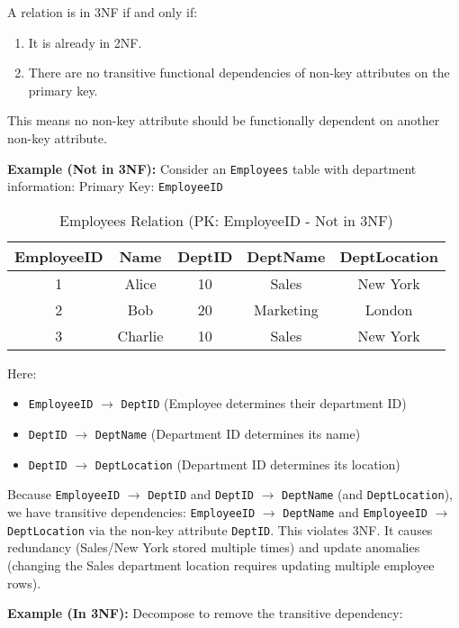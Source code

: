 \documentclass[12pt]{book}
\begin{document}
A relation is in 3NF if and only if:
\begin{enumerate}
    \item It is already in 2NF.
    \item There are no transitive functional dependencies of non-key attributes on the primary key.
\end{enumerate}

This means no non-key attribute should be functionally dependent on another non-key attribute.

\textbf{Example (Not in 3NF):}
Consider an \texttt{Employees} table with department information:
Primary Key: \texttt{EmployeeID}

\begin{table}[htbp]
\centering
\begin{tabular}{@{}ccccc@{}}
\toprule
EmployeeID & Name & DeptID & DeptName & DeptLocation \\
\midrule
1 & Alice & 10 & Sales & New York \\
2 & Bob & 20 & Marketing & London \\
3 & Charlie & 10 & Sales & New York \\
\bottomrule
\end{tabular}
\caption{Employees Relation (PK: EmployeeID - Not in 3NF)}
\label{tab:not_3nf}
\end{table}

Here:
\begin{itemize}
    \item \texttt{EmployeeID} $\rightarrow$ \texttt{DeptID} (Employee determines their department ID)
    \item \texttt{DeptID} $\rightarrow$ \texttt{DeptName} (Department ID determines its name)
    \item \texttt{DeptID} $\rightarrow$ \texttt{DeptLocation} (Department ID determines its location)
\end{itemize}

Because \texttt{EmployeeID} $\rightarrow$ \texttt{DeptID} and \texttt{DeptID} $\rightarrow$ \texttt{DeptName} (and \texttt{DeptLocation}), we have transitive dependencies: \texttt{EmployeeID} $\rightarrow$ \texttt{DeptName} and \texttt{EmployeeID} $\rightarrow$ \texttt{DeptLocation} via the non-key attribute \texttt{DeptID}. This violates 3NF. It causes redundancy (Sales/New York stored multiple times) and update anomalies (changing the Sales department location requires updating multiple employee rows).

\textbf{Example (In 3NF):}
Decompose to remove the transitive dependency:
\end{document}
